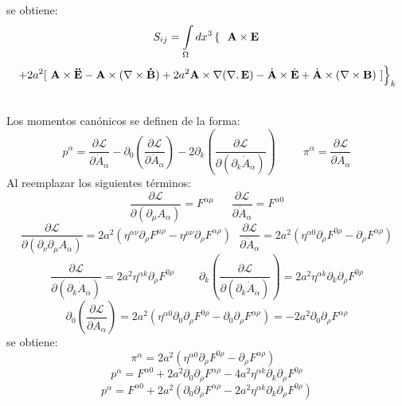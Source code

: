 \documentclass[a4paper,12pt]{article}
\begin{document}
se obtiene:
\begin{equation}
S_{ij}=\int\limits_{\Omega}dx^{3}\left\{\ \ {\bf A}\times{\bf E} \right. 
\end{equation}
$$\left.+2a^2[\ {\bf A}\times{\bf \ddot E}-{\bf A}\times(\nabla\times {\bf \dot B})+2a^2{\bf A}\times\nabla(\nabla\ldotp{\bf E})-\dot{{\bf A}}\times\dot{{\bf E}}+\dot{{\bf A}}\times(\nabla\times{\bf B})\ ]\right\}_k$$
\vspace{0,4cm}

\\

Los momentos canónicos se definen de la forma:
\begin{equation}
p^{\alpha}=\frac{\partial \mathscr{L} }{\partial\dot A_\alpha}-\partial_{0}\left(\frac{\partial\mathscr{L} }{\partial\ddot A_\alpha}  \right)-2\partial_{k}\left(\frac{\partial\mathscr{L} }{\partial(\partial_{k}\dot A_\alpha)}\right)\ \ \ \ \ \ \ \ \ \ \ \pi^{\alpha}=\frac{\partial \mathscr{L} }{\partial\ddot A_\alpha} 
\label{mome}
\end{equation}
Al reemplazar los siguientes términos:
\begin{equation}
\frac{\partial\mathscr{L} }{\partial(\partial_{\mu} A_\alpha)}=F^{\alpha\mu}\ \ \ \ \ \ \ \frac{\partial\mathscr{L} }{\partial\dot A_\alpha}=F^{\alpha0}
\end{equation}
\begin{equation}
\frac{\partial \mathscr{L} }{\partial(\partial_{\nu}\partial_{\mu} A_\alpha)}= 2a^2(\eta^{\alpha\nu}\partial_\rho F^{\mu\rho}-\eta^{\mu\nu}\partial_\rho F^{\alpha\rho})\ \ \  \frac{\partial \mathscr{L} }{\partial\ddot A_\alpha}= 2a^2(\eta^{\alpha0}\partial_\rho F^{0\rho}-\partial_\rho F^{\alpha\rho}) 
\end{equation}
$$\frac{\partial \mathscr{L} }{\partial(\partial_{k}\dot A_\alpha)}=2a^2\eta^{\alpha k}\partial_\rho F^{0\rho}\ \ \ \ \ \ \ \ \ \ \partial_{k}\left(\frac{\partial\mathscr{L} }{\partial(\partial_{k}\dot A_\alpha)}\right)=2a^2\eta^{\alpha k}\partial_k\partial_\rho F^{0\rho} $$ 
$$\partial_0\left(\frac{\partial \mathscr{L} }{\partial\ddot A_\alpha}\right)= 2a^2(\eta^{\alpha0}\partial_0\partial_\rho F^{0\rho}-\partial_0\partial_\rho F^{\alpha\rho})=-2a^2\partial_0\partial_\rho F^{\alpha\rho}$$
se obtiene:
\begin{equation}
\pi^{\alpha}= 2a^2(\eta^{\alpha0}\partial_\rho F^{0\rho}-\partial_\rho F^{\alpha\rho}) \ \ \ 
\label{mo2}
\end{equation}
\begin{equation}
p^\alpha=F^{\alpha0}+2a^2\partial_0\partial_\rho F^{\alpha\rho}-4a^2\eta^{\alpha k}\partial_k\partial_\rho F^{0\rho}  
\label{mo1}
\end{equation}
$$p^\alpha=F^{\alpha0}+2a^2(\partial_0\partial_\rho F^{\alpha\rho}-2a^2\eta^{\alpha k}\partial_k\partial_\rho F^{0\rho})  
$$
\vspace{0,4cm}
\end{document}
